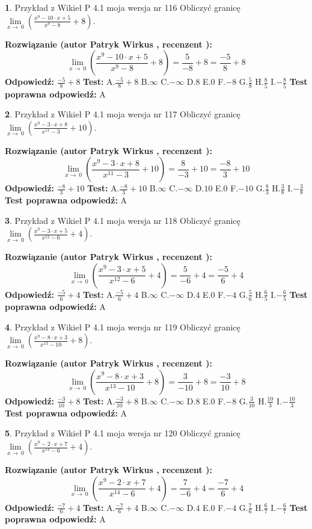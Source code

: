 \documentclass[12pt, a4paper]{article}
\theoremstyle{definition} %
\newtheorem{zad}{}
\newcommand{\zadStart}[1]{\begin{zad}#1\newline}
\newcommand{\zadStop}{\end{zad}}
\newcommand{\rozwStart}[2]{\noindent \textbf{Rozwiązanie (autor #1 , recenzent #2): }\newline}
\newcommand{\rozwStop}{\newline}
\newcommand{\odpStart}{\noindent \textbf{Odpowiedź:}\newline}
\newcommand{\odpStop}{\newline}
\newcommand{\testStart}{\noindent \textbf{Test:}\newline}
\newcommand{\testStop}{\newline}
\newcommand{\kluczStart}{\noindent \textbf{Test poprawna odpowiedź:}\newline}
\newcommand{\kluczStop}{\newline}
\begin{document}
\zadStart{Przykład z Wikieł P 4.1 moja wersja nr 116}
Obliczyć granicę $\lim\limits_{x\to\ 0}(\frac{x^{9}-10 \cdot x +5}{x^{9}-8}+8)$.
\zadStop
\rozwStart{Patryk Wirkus}{}
$$\lim\limits_{x\to\ 0}(\frac{x^{9}-10 \cdot x +5}{x^{9}-8}+8)=\frac{5}{-8}+8=\frac{-5}{8}+8$$
\rozwStop
\odpStart
$\frac{-5}{8}+8$
\odpStop
\testStart
A.$\frac{-5}{8}+8$
B.$\infty$
C.$-\infty$
D.$8$
E.$0$
F.$-8$
G.$\frac{5}{8}$
H.$\frac{8}{5}$
I.$-\frac{8}{5}$
\testStop
\kluczStart
A
\kluczStop



\zadStart{Przykład z Wikieł P 4.1 moja wersja nr 117}
Obliczyć granicę $\lim\limits_{x\to\ 0}(\frac{x^{9}-3 \cdot x +8}{x^{11}-3}+10)$.
\zadStop
\rozwStart{Patryk Wirkus}{}
$$\lim\limits_{x\to\ 0}(\frac{x^{9}-3 \cdot x +8}{x^{11}-3}+10)=\frac{8}{-3}+10=\frac{-8}{3}+10$$
\rozwStop
\odpStart
$\frac{-8}{3}+10$
\odpStop
\testStart
A.$\frac{-8}{3}+10$
B.$\infty$
C.$-\infty$
D.$10$
E.$0$
F.$-10$
G.$\frac{8}{3}$
H.$\frac{3}{8}$
I.$-\frac{3}{8}$
\testStop
\kluczStart
A
\kluczStop



\zadStart{Przykład z Wikieł P 4.1 moja wersja nr 118}
Obliczyć granicę $\lim\limits_{x\to\ 0}(\frac{x^{9}-3 \cdot x +5}{x^{12}-6}+4)$.
\zadStop
\rozwStart{Patryk Wirkus}{}
$$\lim\limits_{x\to\ 0}(\frac{x^{9}-3 \cdot x +5}{x^{12}-6}+4)=\frac{5}{-6}+4=\frac{-5}{6}+4$$
\rozwStop
\odpStart
$\frac{-5}{6}+4$
\odpStop
\testStart
A.$\frac{-5}{6}+4$
B.$\infty$
C.$-\infty$
D.$4$
E.$0$
F.$-4$
G.$\frac{5}{6}$
H.$\frac{6}{5}$
I.$-\frac{6}{5}$
\testStop
\kluczStart
A
\kluczStop



\zadStart{Przykład z Wikieł P 4.1 moja wersja nr 119}
Obliczyć granicę $\lim\limits_{x\to\ 0}(\frac{x^{9}-8 \cdot x +3}{x^{13}-10}+8)$.
\zadStop
\rozwStart{Patryk Wirkus}{}
$$\lim\limits_{x\to\ 0}(\frac{x^{9}-8 \cdot x +3}{x^{13}-10}+8)=\frac{3}{-10}+8=\frac{-3}{10}+8$$
\rozwStop
\odpStart
$\frac{-3}{10}+8$
\odpStop
\testStart
A.$\frac{-3}{10}+8$
B.$\infty$
C.$-\infty$
D.$8$
E.$0$
F.$-8$
G.$\frac{3}{10}$
H.$\frac{10}{3}$
I.$-\frac{10}{3}$
\testStop
\kluczStart
A
\kluczStop



\zadStart{Przykład z Wikieł P 4.1 moja wersja nr 120}
Obliczyć granicę $\lim\limits_{x\to\ 0}(\frac{x^{9}-2 \cdot x +7}{x^{14}-6}+4)$.
\zadStop
\rozwStart{Patryk Wirkus}{}
$$\lim\limits_{x\to\ 0}(\frac{x^{9}-2 \cdot x +7}{x^{14}-6}+4)=\frac{7}{-6}+4=\frac{-7}{6}+4$$
\rozwStop
\odpStart
$\frac{-7}{6}+4$
\odpStop
\testStart
A.$\frac{-7}{6}+4$
B.$\infty$
C.$-\infty$
D.$4$
E.$0$
F.$-4$
G.$\frac{7}{6}$
H.$\frac{6}{7}$
I.$-\frac{6}{7}$
\testStop
\kluczStart
A
\kluczStop
\end{document}
